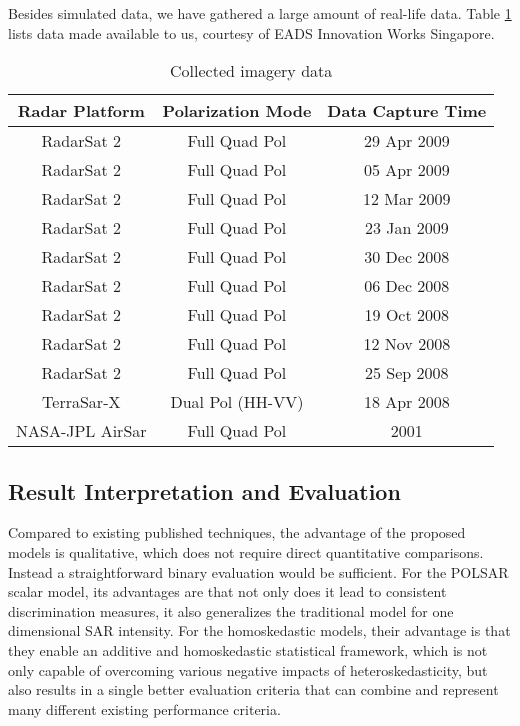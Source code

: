 Besides simulated  data, we have gathered a large amount of real-life data.
Table \ref{tbl:collected_data} lists data made available to us, courtesy of EADS Innovation Works Singapore. 

\begin{table}
\centering
\begin{tabular}{|c|c|c|}
\hline
Radar Platform & Polarization Mode & Data Capture Time \\
\hline
RadarSat 2 & Full Quad Pol & 29 Apr 2009 \\
RadarSat 2 & Full Quad Pol & 05 Apr 2009 \\
RadarSat 2 & Full Quad Pol & 12 Mar 2009 \\
RadarSat 2 & Full Quad Pol & 23 Jan 2009 \\
RadarSat 2 & Full Quad Pol & 30 Dec 2008 \\
RadarSat 2 & Full Quad Pol & 06 Dec 2008 \\
RadarSat 2 & Full Quad Pol & 19 Oct 2008 \\
RadarSat 2 & Full Quad Pol & 12 Nov 2008 \\
RadarSat 2 & Full Quad Pol & 25 Sep 2008 \\
TerraSar-X & Dual Pol (HH-VV) & 18 Apr 2008 \\
NASA-JPL AirSar & Full Quad Pol & 2001 \\
\hline
\end{tabular}
\caption{Collected imagery data}
\label{tbl:collected_data}
\end{table}

\subsection{Result Interpretation and Evaluation}

Compared
                to existing published techniques, the advantage of the
                proposed models is qualitative, which does not require
                direct quantitative comparisons.
Instead
                a straightforward binary evaluation would be sufficient.
For
                the POLSAR scalar model, its advantages are that not
                only does it lead to consistent discrimination measures, it
                also generalizes the traditional model for one
                dimensional SAR intensity.
For
                the homoskedastic models, their advantage is that they
                enable an additive and homoskedastic statistical
                framework, which is not only capable of overcoming various
                negative impacts of heteroskedasticity, but also results
                in a single better evaluation criteria that can combine
                and represent many different existing performance
                criteria.
                
